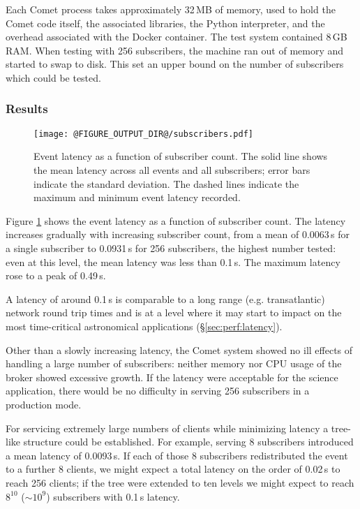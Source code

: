 \documentclass[5p,authoryear]{elsarticle}
\begin{document}
Each Comet process takes approximately 32\,MB of memory, used to hold the
Comet code itself, the associated libraries, the Python interpreter, and the
overhead associated with the Docker container. The test system contained 8\,GB
RAM. When testing with 256 subscribers, the machine ran out of memory and
started to swap to disk. This set an upper bound on the number of subscribers
which could be tested.

\subsubsection{Results}

\begin{figure}
  \begin{center}
  \texttt{[image: @FIGURE\_OUTPUT\_DIR@/subscribers.pdf]}
  \end{center}

  \caption{Event latency as a function of subscriber count. The solid line
  shows the mean latency across all events and all subscribers; error bars
  indicate the standard deviation. The dashed lines indicate the maximum and
  minimum event latency recorded.}

  \label{fig:subscribers}
\end{figure}

Figure \ref{fig:subscribers} shows the event latency as a function of
subscriber count. The latency increases gradually with increasing subscriber
count, from a mean of 0.0063\,s for a single subscriber to 0.0931\,s for 256
subscribers, the highest number tested: even at this level, the mean latency
was less than 0.1\,s. The maximum latency rose to a peak of 0.49\,s.

A latency of around 0.1\,s is comparable to a long range (e.g. transatlantic)
network round trip times and is at a level where it may start to impact on the
most time-critical astronomical applications (\S\ref{sec:perf:latency}).

Other than a slowly increasing latency, the Comet system showed no
ill effects of handling a large number of subscribers: neither memory nor CPU
usage of the broker showed excessive growth. If the latency were acceptable
for the science application, there would be no difficulty in serving 256
subscribers in a production mode.

For servicing extremely large numbers of clients while minimizing latency a
tree-like structure could be established. For example, serving 8 subscribers
introduced a mean latency of 0.0093\,s. If each of those 8 subscribers
redistributed the event to a further 8 clients, we might expect a total
latency on the order of 0.02\,s to reach 256 clients; if the tree were
extended to ten levels we might expect to reach $8^{10}$ ($\sim 10^9$)
subscribers with 0.1\,s latency.
\end{document}
